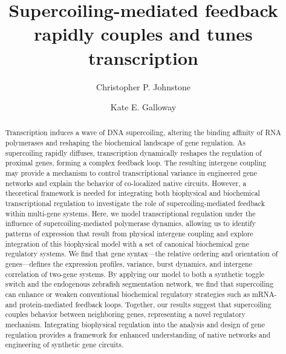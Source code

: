 \documentclass[11pt]{article}
\title{Supercoiling-mediated feedback rapidly couples and tunes transcription}
\author{Christopher P. Johnstone}
\author{Kate E. Galloway}
\affil{Department of Chemical Engineering, MIT, 25 Ames St., Cambridge, MA 02139, USA}
\date{}
\begin{document}
\maketitle

\begin{abstract} \noindent
    Transcription induces a wave of DNA supercoiling, altering the binding affinity of RNA polymerases and reshaping the biochemical landscape of gene regulation. 
     As supercoiling rapidly diffuses, transcription dynamically reshapes the regulation of proximal genes, forming a complex feedback loop. The resulting intergene coupling may provide a mechanism to control transcriptional variance in engineered gene networks and explain the behavior of co-localized native circuits.
    However, a theoretical framework is needed for integrating  both biophysical and biochemical transcriptional regulation to investigate the role of supercoiling-mediated feedback within multi-gene systems.
    Here, we model transcriptional regulation under the influence of supercoiling-mediated polymerase dynamics, allowing us to identify patterns of expression that result from physical intergene coupling and explore integration of this biophysical model with a set of canonical biochemical gene regulatory systems.  
    We find that gene syntax---the relative ordering and orientation of genes---defines the expression profiles, variance, burst dynamics, and intergene correlation of two-gene systems. By applying our model to both a synthetic toggle switch and the endogenous zebrafish segmentation network, we find that supercoiling can enhance or weaken conventional biochemical regulatory strategies such as mRNA- and protein-mediated feedback loops. 
    Together, our results suggest that supercoiling couples behavior between neighboring genes, representing a novel regulatory mechanism. 
    Integrating biophysical regulation into the analysis and design of gene regulation provides a framework for enhanced understanding of native networks and engineering of synthetic gene circuits.
\end{abstract}
\end{document}
